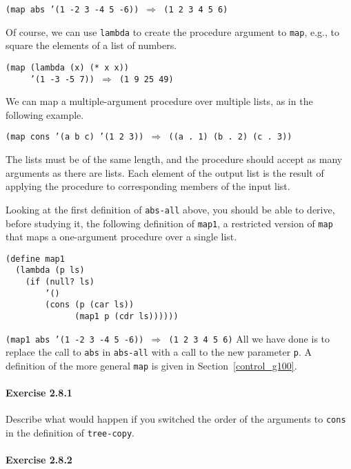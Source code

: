 \texttt{(map abs '(1 -2 3 -4 5 -6)) \(\Rightarrow\) (1 2 3 4 5 6)}

Of course, we can use \texttt{lambda} to create the procedure argument to
\texttt{map}, e.g., to square the elements of a list of numbers.


\begin{alltt}
(map (lambda (x) (* x x))
     '(1 -3 -5 7)) \(\Rightarrow\) (1 9 25 49)
\end{alltt}


We can map a multiple-argument procedure over multiple lists, as
in the following example.


\texttt{(map cons '(a b c) '(1 2 3)) \(\Rightarrow\) ((a . 1) (b . 2) (c . 3))}

The lists must be of the same length, and the procedure should accept as
many arguments as there are lists.
Each element of the output list is the result of applying the procedure
to corresponding members of the input list.


Looking at the first definition of \texttt{abs-all} above, you should be able
to derive, before studying it, the following definition of
\label{start_s148}\texttt{map1}, a restricted version of
\texttt{map} that maps a one-argument procedure over a single list.


\begin{alltt}
(define map1\label{start_defn_map1}
  (lambda (p ls)
    (if (null? ls)
        '()
        (cons (p (car ls))
              (map1 p (cdr ls))))))
\end{alltt}


\texttt{(map1 abs '(1 -2 3 -4 5 -6)) \(\Rightarrow\) (1 2 3 4 5 6)}
All we have done is to replace the call to \texttt{abs} in \texttt{abs-all}
with a call to the new parameter \texttt{p}.
A definition of the more general \texttt{map} is given in Section \ref{control_g100}.



\paragraph{Exercise \label{start_g33}2.8.1}


\label{start_s149}Describe what would happen if you switched the order of the arguments
to \texttt{cons} in the definition of \texttt{tree-copy}.




\paragraph{Exercise \label{start_g34}2.8.2}


